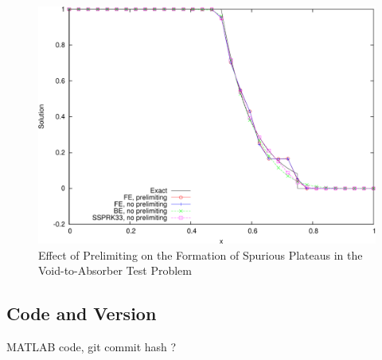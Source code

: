 \begin{figure}[h]
   \centering
   \includegraphics[width=\textwidth]{prelimiting_void_to_absorber/prelimiting.pdf}
   \caption{Effect of Prelimiting on the Formation of Spurious Plateaus
      in the Void-to-Absorber Test Problem}
   \label{fig:prelimiting_void_to_absorber}
\end{figure}
\subsection{Code and Version}
MATLAB code, git commit hash ?
